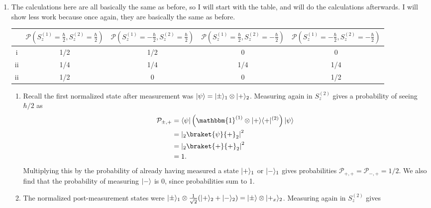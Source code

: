 \documentclass[11pt, letterpaper]{article}
\begin{document}
\begin{enumerate}
		Similar logic and calculations show that measuring $-\hbar /2$ yields a collapsed normalized state of $\ket{-}_1 \otimes \ket{-}_2$. I will omit the calculation since it is basically the same and needlessly messy.



	\item The calculations here are all basically the same as before, so I will start with the table, and will do the calculations afterwards. I will show less work because once again, they are basically the same as before.

		\hspace{-5em}\begin{tabular}{c|c|c|c|c}
			\toprule
			&$\mathcal{P} \left( S_z^{(1)} =\frac{\hbar }{2} ,S_z^{(2)} =\frac{\hbar }{2}  \right) $&$\mathcal{P} \left( S_z^{(1)} =-\frac{\hbar }{2} ,S_z^{(2)} =\frac{\hbar }{2}  \right) $&$\mathcal{P} \left( S_z^{(1)} =\frac{\hbar }{2} ,S_z^{(2)} =-\frac{\hbar }{2}  \right) $&$\mathcal{P} \left( S_z^{(1)} =-\frac{\hbar }{2} ,S_z^{(2)} =-\frac{\hbar }{2}  \right) $\\
			\hline
			i&1/2&1/2&0&0\\
			ii&1/4&1/4&1/4&1/4\\
			ii&1/2&0&0&1/2\\
			\bottomrule
		\end{tabular}
		\begin{enumerate}
			\item Recall the first normalized state after measurement was $\lvert\psi \rangle =\lvert\pm\rangle_1 \otimes \lvert+\rangle_2$. Measuring again in $S_z^{(2)} $ gives a probability of seeing $\hbar /2$ as
				\begin{align*}
					\mathcal{P}_{\pm,+} &=\bra{\psi } \left( \mathbbm{1}^{(1)} \otimes \ket{+} \bra{+}^{(2)}  \right) \ket{\psi } \\
							  &=\left| _2\braket{\psi }{+}_2 \right| ^2\\
							  &=\left|_2 \braket{+}{+}_2 \right| ^2\\
							  &=1
				.\end{align*}
				Multiplying this by the probability of already having measured a state $\lvert+\rangle_1 $ or $\lvert-\rangle_1$ gives probabilities $\mathcal{P}_{+,+}=\mathcal{P}_{-,+} =1/2$. We also find that the probability of measuring $\lvert-\rangle $ is $0$, since probabilities sum to 1.
		\item The normalized post-measurement states were $\lvert\pm\rangle_1 \otimes \frac{1}{\sqrt{2} } (\lvert+\rangle_2 +\lvert-\rangle_2) =\lvert\pm\rangle \otimes \lvert+_x\rangle_2$. Measuring again in $S_z^{(2)} $ gives

\end{enumerate}
\end{enumerate}
\end{document}
